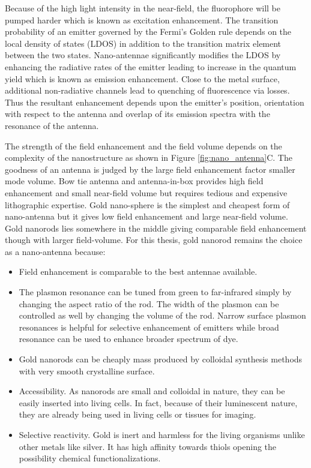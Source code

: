\documentclass[11pt,a4paper,onecolumn]{article}
\begin{document}
Because of the high light intensity in the near-field, the fluorophore will be pumped harder which is known as excitation enhancement.
The transition probability of an emitter governed by the Fermi's Golden rule depends on the local density of states (LDOS) in addition to the transition matrix element between the two states.
Nano-antennae significantly modifies the LDOS by enhancing the radiative rates of the emitter leading to increase in the quantum yield which is known as emission enhancement.
Close to the metal surface, additional non-radiative channels lead to quenching of fluorescence via losses.
Thus the resultant enhancement depends upon the emitter's position, orientation with respect to the antenna and overlap of its emission spectra with the resonance of the antenna.

The strength of the field enhancement and the field volume depends on the complexity of the nanostructure as shown in Figure \ref{fig:nano_antenna}C.
The goodness of an antenna is judged by the large field enhancement factor smaller mode volume.
Bow tie antenna and antenna-in-box provides high field enhancement and small near-field volume but requires tedious and expensive lithographic expertise.\cite{novotny2011antennas,regmi2017thesis}
Gold nano-sphere is the simplest and cheapest form of nano-antenna but it gives low field enhancement and large near-field volume.\cite{punj2013gold}
Gold nanorods lies somewhere in the middle giving comparable field enhancement though with larger field-volume. For this thesis, gold nanorod remains the choice as a nano-antenna because:
\begin{itemize}
	\item Field enhancement is comparable to the best antennae available.
	\item The plasmon resonance can be tuned from green to far-infrared simply by changing the aspect ratio of the rod.\cite{link1999simulation}
	The width of the plasmon can be controlled as well by changing the volume of the rod.
	Narrow surface plasmon resonances is helpful for selective enhancement of emitters while broad resonance can be used to enhance broader spectrum of dye.\cite{yuan2013thousandfold,khatua2014resonant}
	\item Gold nanorods can be cheaply mass produced by colloidal synthesis methods with very smooth crystalline surface.\cite{nikoobakht2003preparation,perezjuste2005gold}
	\item Accessibility. As nanorods are small and colloidal in nature, they can be easily inserted into living cells.
	In fact, because of their luminescent nature, they are already being used in living cells or tissues for imaging.
	\item Selective reactivity. Gold is inert and harmless for the living organisms unlike other metals like silver.
	It has high affinity towards thiols opening the possibility chemical functionalizations.
\end{itemize}
%
\end{document}
